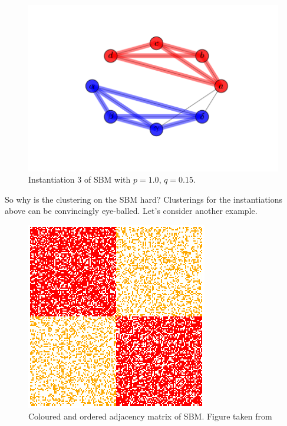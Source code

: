 \begin{figure}[h]
%
  \includegraphics[width=\linewidth]{labels_and_colors_3.png}
  \caption{Instantiation 3 of SBM with $p=1.0$, $q=0.15$.}\label{fig:awesome_image3}
\endminipage
\end{figure}


So why is the clustering on the SBM hard?  Clusterings for the instantiations above can be convincingly eye-balled.  Let's consider another example.  

\begin{figure}[h]
\begin{center}
  \includegraphics[scale=0.5]{SBM}
  \caption{Coloured and ordered adjacency matrix of SBM. Figure taken from \cite{SBM_adjacency_talk}}
  \label{fig:SBM_matrix_colour}
 \end{center}
\end{figure}

